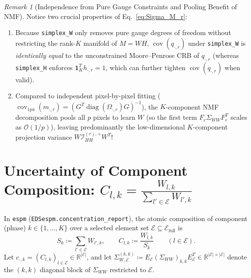 \documentclass[11pt,a4paper]{article}
\theoremstyle{plain}
\theoremstyle{definition}
\theoremstyle{remark}
\newtheorem{remark}[theorem]{Remark}
\newcommand{\R}{\mathbb{R}}
\newcommand{\E}{\mathcal{E}}
\newcommand{\cI}{\mathcal{I}}
\newcommand{\diag}{\operatorname{diag}}
\newcommand{\cov}{\operatorname{cov}}
\newcommand{\one}{\mathbf{1}}
\begin{document}
\begin{remark}[Independence from Pure Gauge Constraints and Pooling Benefit of NMF]
Notice two crucial properties of Eq.~\eqref{eq:Sigma_M_r}:
\begin{enumerate}[leftmargin=1.5em]
    \item Because \texttt{simplex\_W} only removes pure gauge degrees of freedom without restricting the rank-$K$ manifold of $M=WH$, $\cov(q_{\cdot, r})$ under \texttt{simplex\_W} is \emph{identically equal} to the unconstrained Moore--Penrose CRB of $q_{\cdot, r}$ (whereas \texttt{simplex\_H} enforces $\one_K^T h_{\cdot,r}=1$, which can further tighten $\cov(q_{\cdot, r})$ when valid).
    \item Compared to independent pixel-by-pixel fitting ($\cov_{\text{1px}}(m_{\cdot, r}) = (G^T \diag(\Omega_{\cdot, r}) G)^{-1}$), the $K$-component NMF decomposition pools all $p$ pixels to learn $W$ (so the first term $F_r \Sigma_{WW} F_r^T$ scales as $\mathcal{O}(1/p)$), leaving predominantly the low-dimensional $K$-component projection variance $W \cI_{HH}^{(r),+} W^T$!
\end{enumerate}
\end{remark}

\section{Uncertainty of Component Composition: \texorpdfstring{$C_{l,k} = \frac{W_{l,k}}{\sum_{l'\in\E} W_{l',k}}$}{C\_\{l,k\} = W\_\{l,k\} / sum\_l W\_\{l,k\}}}

In \texttt{espm} (\texttt{EDSespm.concentration\_report}), the atomic composition of component (phase) $k \in \{1,\dots,K\}$ over a selected element set $\E \subseteq \E_{\text{full}}$ is
\begin{equation}
\label{eq:C_def}
S_k \coloneqq \sum_{l' \in \E} W_{l', k}, \qquad C_{l,k} \coloneqq \frac{W_{l,k}}{S_k} \qquad (l \in \E).
\end{equation}
Let $c_{\cdot, k} = (C_{l,k})_{l \in \E} \in \R^{|\E|}$, and let $\Sigma_{W,\E}^{(k,k)} \coloneqq E_\E (\Sigma_{WW})_{k,k} E_\E^T \in \R^{|\E| \times |\E|}$ denote the $(k,k)$ diagonal block of $\Sigma_{WW}$ restricted to $\E$.
\end{document}

